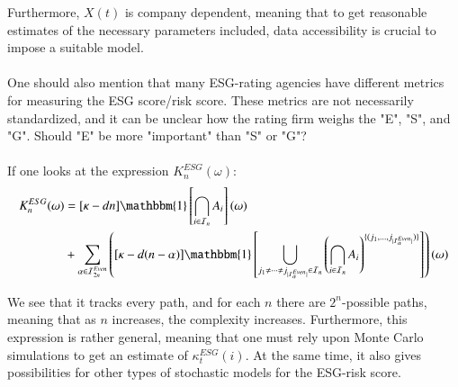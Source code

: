 Furthermore, $X(t)$ is company dependent, meaning that to get reasonable estimates of the necessary parameters included, data accessibility is crucial to impose a suitable model. 
\\~\\ 
One should also mention that many ESG-rating agencies have different metrics for measuring the ESG score/risk score. These metrics are not necessarily standardized, and it can be unclear how the rating firm weighs the "E", "S", and "G". Should "E" be more "important" than "S" or "G"? 
\\~\\
If one looks at the expression $K_{n}^{ESG}(\omega)$: 
\begin{align*}
K_{n}^{ESG}(\omega) &= 
[\kappa -dn]\mathbbm{1}\left[
\bigcap_{i\in \mathcal{I}_{n}}A_{i}
\right](\omega) \\ 
&+ 
\sum_{\alpha \in \mathcal{I}_{2n}^{Even}}
\left(
[\kappa -d(n-\alpha)]\mathbbm{1}\left[
\bigcup_{
j_{1}\neq \dots \neq j_{|\mathcal{I}_{\alpha}^{Even}|}
\in \mathcal{I}_{n}
}\left(
\bigcap_{i\in \mathcal{I}_{n}}A_{i}
\right)^{
\{
(j_{1}, \dots , j_{|\mathcal{I}_{\alpha}^{Even}|})
\}
}
\right]
\right)(\omega) 
\end{align*}

We see that it tracks every path, and for each $n$ there are $2^{n}$-possible paths, meaning that as $n$ increases, the complexity increases. Furthermore, this expression is rather general, meaning that one must rely upon Monte Carlo simulations to get an estimate of $\kappa_{t}^{ESG}(i)$. At the same time, it also gives possibilities for other types of stochastic models for the ESG-risk score. 





